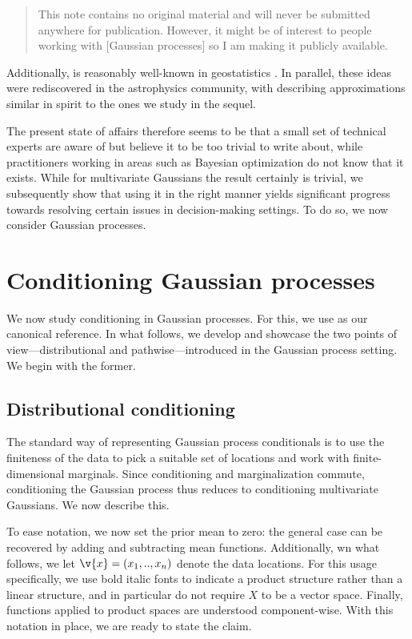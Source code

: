 \documentclass[11pt]{book}
\begin{document}
\begin{quotation}
This note contains no original material and will never be submitted anywhere for publication. However, it might be of interest to people working with [Gaussian processes] so I am making it publicly available.
\end{quotation}

Additionally,  is reasonably well-known in geostatistics \cite{journel78,defouquet94,emery07,oliver96}.
In parallel, these ideas were rediscovered in the astrophysics community, with \textcite{hoffman91} describing approximations similar in spirit to the ones we study in the sequel.

The present state of affairs therefore seems to be that a small set of technical experts are aware of  but believe it to be too trivial to write about, while practitioners working in areas such as Bayesian optimization do not know that it exists.
While for multivariate Gaussians the result certainly is trivial, we subsequently show that using it in the right manner yields significant progress towards resolving certain issues in decision-making settings.
To do so, we now consider Gaussian processes.

\section{Conditioning Gaussian processes}

We now study conditioning in Gaussian processes.
For this, we use \textcite{rasmussen06} as our canonical reference.
In what follows, we develop and showcase the two points of view---distributional and pathwise---introduced in the Gaussian process setting.
We begin with the former.

\subsection{Distributional conditioning}

The standard way of representing Gaussian process conditionals is to use the finiteness of the data to pick a suitable set of locations and work with finite-dimensional marginals.
Since conditioning and marginalization commute, conditioning the Gaussian process thus reduces to conditioning multivariate Gaussians.
We now describe this.

To ease notation, we now set the prior mean to zero: the general case can be recovered by adding and subtracting mean functions.
Additionally, wn what follows, we let $\v{x} = (x_1,..,x_n)$ denote the data locations.
For this usage specifically, we use bold italic fonts to indicate a product structure rather than a linear structure, and in particular do not require $X$ to be a vector space.
Finally, functions applied to product spaces are understood component-wise.
With this notation in place, we are ready to state the claim.
\end{document}
